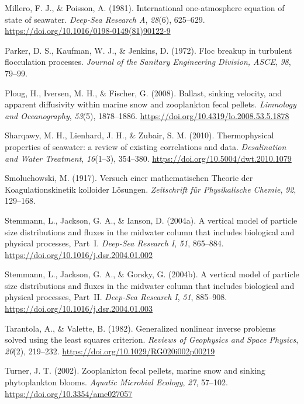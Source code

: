 \documentclass[12pt,a4paper]{report}
\numberwithin{equation}{chapter}
\begin{document}
Millero, F. J., \& Poisson, A. (1981). International one-atmosphere equation of
state of seawater. \textit{Deep-Sea Research A}, \textit{28}(6), 625--629.
\href{https://doi.org/10.1016/0198-0149(81)90122-9}{https://doi.org/10.1016/0198-0149(81)90122-9}

Parker, D. S., Kaufman, W. J., \& Jenkins, D. (1972). Floc breakup in turbulent
flocculation processes. \textit{Journal of the Sanitary Engineering Division, ASCE},
\textit{98}, 79--99.

Ploug, H., Iversen, M. H., \& Fischer, G. (2008). Ballast, sinking velocity, and
apparent diffusivity within marine snow and zooplankton fecal pellets.
\textit{Limnology and Oceanography}, \textit{53}(5), 1878--1886.
\href{https://doi.org/10.4319/lo.2008.53.5.1878}{https://doi.org/10.4319/lo.2008.53.5.1878}

Sharqawy, M. H., Lienhard, J. H., \& Zubair, S. M. (2010). Thermophysical
properties of seawater: a review of existing correlations and data.
\textit{Desalination and Water Treatment}, \textit{16}(1--3), 354--380.
\href{https://doi.org/10.5004/dwt.2010.1079}{https://doi.org/10.5004/dwt.2010.1079}

Smoluchowski, M. (1917). Versuch einer mathematischen Theorie der
Koagulationskinetik kolloider L\"{o}sungen. \textit{Zeitschrift f\"{u}r Physikalische
Chemie}, \textit{92}, 129--168.

Stemmann, L., Jackson, G. A., \& Ianson, D. (2004a). A vertical model of particle
size distributions and fluxes in the midwater column that includes biological
and physical processes, Part~I. \textit{Deep-Sea Research I}, \textit{51}, 865--884.
\href{https://doi.org/10.1016/j.dsr.2004.01.002}{https://doi.org/10.1016/j.dsr.2004.01.002}

Stemmann, L., Jackson, G. A., \& Gorsky, G. (2004b). A vertical model of particle
size distributions and fluxes in the midwater column that includes biological
and physical processes, Part~II. \textit{Deep-Sea Research I}, \textit{51}, 885--908.
\href{https://doi.org/10.1016/j.dsr.2004.01.003}{https://doi.org/10.1016/j.dsr.2004.01.003}

Tarantola, A., \& Valette, B. (1982). Generalized nonlinear inverse problems
solved using the least squares criterion.
\textit{Reviews of Geophysics and Space Physics}, \textit{20}(2), 219--232.
\href{https://doi.org/10.1029/RG020i002p00219}{https://doi.org/10.1029/RG020i002p00219}

Turner, J. T. (2002). Zooplankton fecal pellets, marine snow and sinking
phytoplankton blooms. \textit{Aquatic Microbial Ecology}, \textit{27}, 57--102.
\href{https://doi.org/10.3354/ame027057}{https://doi.org/10.3354/ame027057}
\end{document}
